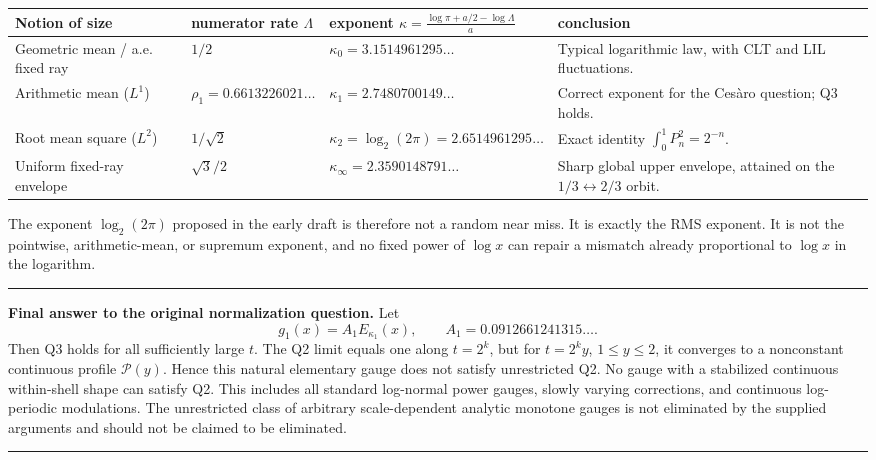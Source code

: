 \documentclass[11pt,oneside]{article}
\theoremstyle{definition}
\theoremstyle{remark}
\newenvironment{boxedremark}{%
  \par\smallskip\noindent\begin{center}\begin{minipage}{0.95\textwidth}%
  \hrule\vspace{0.65em}\small
}{%
  \vspace{0.65em}\hrule\end{minipage}\end{center}\smallskip
}
\begin{document}
\begin{center}
\small
\begin{tabularx}{\textwidth}{@{}>{\raggedright\arraybackslash}p{}
 >{\centering\arraybackslash}p{}
 >{\centering\arraybackslash}p{}>{\raggedright\arraybackslash}X@{}}
\toprule
Notion of size & numerator rate $\Lambda$ & exponent
$\displaystyle\kappa=\frac{\log\pi+a/2-\log\Lambda}{a}$ & conclusion\\
\midrule
Geometric mean / a.e. fixed ray
& $1/2$
& $\kappa_0=3.1514961295\ldots$
& Typical logarithmic law, with CLT and LIL fluctuations.\\[0.6em]
Arithmetic mean ($L^1$)
& $\rho_1=0.6613226021\ldots$
& $\kappa_1=2.7480700149\ldots$
& Correct exponent for the Ces\`aro question; Q3 holds.\\[0.6em]
Root mean square ($L^2$)
& $1/\sqrt2$
& $\kappa_2=\log_2(2\pi)=2.6514961295\ldots$
& Exact identity $\int_0^1P_n^2=2^{-n}$.\\[0.6em]
Uniform fixed-ray envelope
& $\sqrt3/2$
& $\kappa_\infty=2.3590148791\ldots$
& Sharp global upper envelope, attained on the $1/3\leftrightarrow2/3$ orbit.\\
\bottomrule
\end{tabularx}
\end{center}

The exponent $\log_2(2\pi)$ proposed in the early draft is therefore not a
random near miss.  It is exactly the RMS exponent.  It is not the pointwise,
arithmetic-mean, or supremum exponent, and no fixed power of $\log x$ can
repair a mismatch already proportional to $\log x$ in the logarithm.

\begin{boxedremark}
\textbf{Final answer to the original normalization question.}
Let
\[
 g_1(x)=A_1E_{\kappa_1}(x),
 \qquad
 A_1=0.0912661241315\ldots .
\]
Then Q3 holds for all sufficiently large $t$.  The Q2 limit equals one along
$t=2^k$, but for $t=2^ky$, $1\le y\le2$, it converges to a nonconstant
continuous profile $\mathscr P(y)$.  Hence this natural elementary gauge does
not satisfy unrestricted Q2.  No gauge with a stabilized continuous
within-shell shape can satisfy Q2.  This includes all standard log-normal
power gauges, slowly varying corrections, and continuous log-periodic
modulations.  The unrestricted class of arbitrary scale-dependent analytic
monotone gauges is not eliminated by the supplied arguments and should not be
claimed to be eliminated.
\end{boxedremark}
\end{document}
